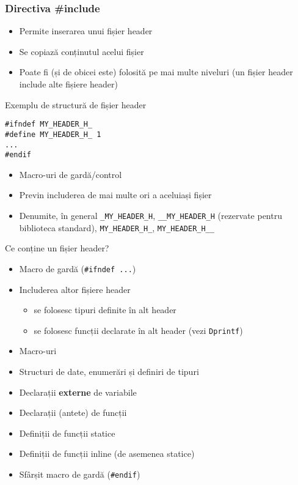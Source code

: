 \documentclass{beamer}
\begin{document}
\frame{\tableofcontents[currentsection]}

\begin{frame}
	\frametitle{Directiva \#include}
	\begin{itemize}
		\item Permite inserarea unui fișier header
		\item Se copiază conținutul acelui fișier
		\item Poate fi (și de obicei este) folosită pe mai multe niveluri (un
fișier header include alte fișiere header)
	\end{itemize}
\end{frame}

\begin{frame}{Exemplu de structură de fișier header}
	\begin{beamerboxesrounded}[lower=block body,shadow=true]{}
		\texttt{\#ifndef MY\_HEADER\_H\_ \\
\#define MY\_HEADER\_H\_	1 \\
... \\
\#endif \\
}
	\end{beamerboxesrounded}
	\begin{itemize}
		\item Macro-uri de gardă/control
		\item Previn includerea de mai multe ori a aceluiași fișier
		\item Denumite, în general \texttt{\_MY\_HEADER\_H},
\texttt{\_\_MY\_HEADER\_H} (rezervate pentru biblioteca standard),
\texttt{MY\_HEADER\_H\_}, \texttt{MY\_HEADER\_H\_\_}
	\end{itemize}
\end{frame}

\begin{frame}{Ce conține un fișier header?}
	\begin{itemize}
		\item Macro de gardă (\texttt{\#ifndef ...})
		\item Includerea altor fișiere header
			\begin{itemize}
				\item se folosesc tipuri definite în alt header
				\item se folosesc funcții declarate în alt header (vezi \texttt{Dprintf})
			\end{itemize}
		\item Macro-uri
		\item Structuri de date, enumerări și definiri de tipuri
		\item Declarații \textbf{externe} de variabile
		\item Declarații (antete) de funcții
		\item Definiții de funcții statice
		\item Definiții de funcții inline (de asemenea statice)
		\item Sfârșit macro de gardă (\texttt{\#endif})
	\end{itemize}
\end{frame}
\end{document}
